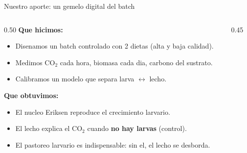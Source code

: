 \documentclass[aspectratio=169,11pt]{beamer}
\begin{document}
\begin{frame}{Nuestro aporte: un gemelo digital del batch}
  \begin{columns}
    \begin{column}{0.50\textwidth}
      \textbf{Que hicimos:}
      \begin{itemize}
        \item Disenamos un batch controlado con 2 dietas (alta y baja calidad).
        \item Medimos CO$_2$ cada hora, biomasa cada dia, carbono del sustrato.
        \item Calibramos un modelo que separa larva $\leftrightarrow$ lecho.
      \end{itemize}
      \vspace{0.3cm}
      \textbf{Que obtuvimos:}
      \begin{itemize}
        \item El nucleo Eriksen reproduce el crecimiento larvario.
        \item El lecho explica el CO$_2$ cuando \textbf{no hay larvas} (control).
        \item El pastoreo larvario es indispensable: sin el, el lecho se desborda.
      \end{itemize}
    \end{column}
    \begin{column}{0.45\textwidth}
      \centering
    \end{column}
  \end{columns}
\end{frame}
\end{document}
